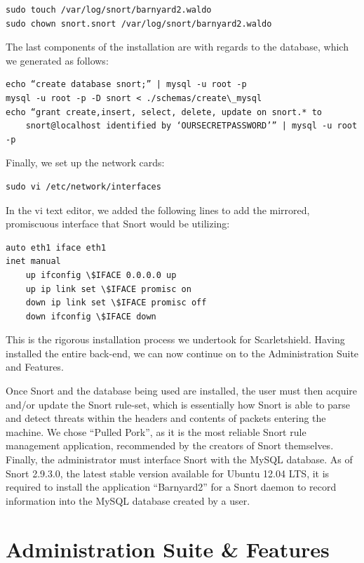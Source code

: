 \documentclass[12pt,letterpaper,titlepage]{report}
\begin{document}
{\begin{verbatim}
sudo touch /var/log/snort/barnyard2.waldo 
sudo chown snort.snort /var/log/snort/barnyard2.waldo
\end{verbatim}
The last components of the installation are with regards to the database, which
we generated as follows:     
\begin{verbatim}
echo “create database snort;” | mysql -u root -p
mysql -u root -p -D snort < ./schemas/create\_mysql     
echo “grant create,insert, select, delete, update on snort.* to 
    snort@localhost identified by ‘OURSECRETPASSWORD’” | mysql -u root -p
\end{verbatim}
Finally, we set up the network cards:     
\begin{verbatim}
sudo vi /etc/network/interfaces
\end{verbatim}
In the vi text editor, we added the following lines to add the mirrored,
promiscuous interface that Snort would be utilizing:
     
\begin{verbatim}
auto eth1 iface eth1
inet manual         
    up ifconfig \$IFACE 0.0.0.0 up         
    up ip link set \$IFACE promisc on         
    down ip link set \$IFACE promisc off         
    down ifconfig \$IFACE down
\end{verbatim}

This is the rigorous installation process we undertook for Scarletshield.
Having installed the entire back-end, we can now continue on to the
Administration Suite and Features.


Once Snort and the database being used are installed, the user must then acquire
and/or update the Snort rule-set, which is essentially how Snort is able to parse
and detect threats within the headers and contents of packets entering the
machine.  We chose ``Pulled Pork'', as it is the most reliable Snort rule management
application, recommended by the creators of Snort themselves.  Finally, the
administrator must interface Snort with the MySQL database.  As of Snort
2.9.3.0, the latest stable version available for Ubuntu 12.04 LTS, it is
required to install the application ``Barnyard2'' for a Snort daemon to record
information into the MySQL database created by a user.

\chapter{Administration Suite \& Features}

}
\end{document}
